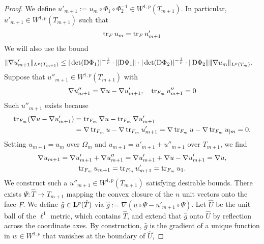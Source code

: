 \documentclass[a4paper]{article}
\begin{document}
\begin{proof}
    We define $u'_{m+1} := u_{{m}} \circ \Phi_1 \circ \Phi_2^{-1} \in W^{1,p}(T_{m+1})$. 
    In particular, $u'_{m+1} \in W^{1,p}(T_{m+1})$ such that 
    \begin{align*}
        \operatorname{tr}_F u_{m} = \operatorname{tr}_F u'_{m+1}
    \end{align*}
    We will also use the bound 
    \begin{align*}
        \| \nabla u'_{m+1} \|_{L^{p}(T_{m+1})}
        &\leq 
        |\det({\mathrm D} \Phi_1)|^{-\frac 1 p} \cdot \| {\mathrm D} \Phi_1 \|
        \cdot 
        |\det({\mathrm D} \Phi_2)|^{-\frac 1 p} \cdot \| {\mathrm D} \Phi_2 \|
        \| \nabla u_{m} \|_{L^{p}(T_{m})}
        .
    \end{align*}
    Suppose that $u''_{m+1} \in W^{1,p}(T_{m+1})$ with 
    \begin{align*}
        \nabla u''_{m+1} = \nabla u - \nabla u'_{m+1}, 
        \quad 
        \operatorname{tr}_{F_{m}} u''_{m+1} = 0
    \end{align*}
    Such $u''_{m+1}$ exists because 
    \begin{align*}
        \operatorname{tr}_{F_{m}}( \nabla u - \nabla u'_{m+1} ) 
        &= 
        \operatorname{tr}_{F_{m}} \nabla u - \operatorname{tr}_{F_{m}} \nabla u'_{m+1}
        \\&= 
        \nabla \operatorname{tr}_{F_{m}} u - \nabla \operatorname{tr}_{F_{m}} u'_{m+1}
        = 
        \nabla \operatorname{tr}_{F_{m}} u - \nabla \operatorname{tr}_{F_{m}} u_{|m}
        = 0
        .
    \end{align*}
    Setting $u_{m+1} = u_{m}$ over $\Omega_{m}$ and $u_{m+1} = u'_{m+1} + u''_{m+1}$ over $T_{m+1}$, 
    we find 
    \begin{gather*}
        \nabla u_{m+1} = \nabla u'_{m+1} + \nabla u''_{m+1} = \nabla u'_{m+1} + \nabla u - \nabla u'_{m+1} = \nabla u,
        \\
        \operatorname{tr}_{F_{m}} u_{m+1} = \operatorname{tr}_{F_{m}} u'_{m+1} = \operatorname{tr}_{F_{m}} u_1.
    \end{gather*}
    We construct such a $u''_{m+1} \in W^{1,p}(T_{m+1})$ satisfying desirable bounds.
    There exists $\Psi : \hat T \rightarrow T_{m+1}$ mapping the convex closure of the $n$ unit vectors onto the face $F$.
    We define $\hat g \in {\mathbf L}^p(\hat T)$ via $\hat g := \nabla ( u \circ \Psi - u'_{m+1} \circ \Psi )$. 
    Let $\hat U$ be the unit ball of the $\ell^1$ metric, which contains $\hat T$,
    and extend that $\hat g$ onto $\hat U$ by reflection across the coordinate axes. 
    By construction, $\hat g$ is the gradient of a unique function in $w \in W^{1,p}$ that vanishes at the boundary of $\hat U$,

\end{proof}
\end{document}
